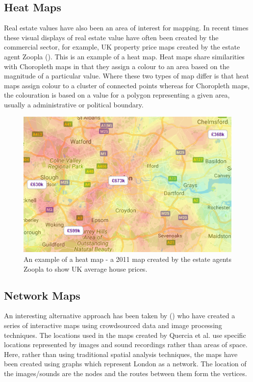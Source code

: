 \subsection{Heat Maps}
Real estate values have also been an area of interest for mapping. In recent times these visual displays of real estate value have often been created by the commercial sector, for example, UK property price maps created by the estate agent Zoopla (\cite{zoopla}). This is an example of a heat map.
Heat maps share similarities with Choropleth maps in that they assign a colour to an area based on the magnitude of a particular value. Where these two types of map differ is that heat maps assign colour to a cluster of connected points whereas for Choropleth maps, the colouration is based on a value for a polygon representing a given area, usually a administrative or political boundary.

\begin{figure}[H]
\centering
\includegraphics[scale=1]{figures/zoopla_heat}
\decoRule
\caption{An example of a heat map - a 2011 map created by the estate agents Zoopla to show UK average house prices.}
\end{figure}


\subsection{Network Maps}
An interesting alternative approach has been taken by (\cite{QAS16}) who have created a series of interactive maps using crowdsourced data and image processing techniques. The locations used in the maps created by Quercia et al. use specific locations represented by images and sound recordings rather than areas of space. Here, rather than using traditional spatial analysis techniques, the maps have been created using graphs which represent London as a network. The location of the images/sounds are the nodes and the routes between them form the vertices.

